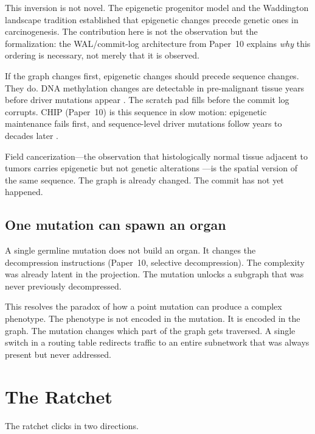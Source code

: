 \documentclass[11pt]{article}
\theoremstyle{definition}
\begin{document}
This inversion is not novel. The epigenetic progenitor model
\cite{Feinberg2006} and the Waddington landscape tradition
established that epigenetic changes precede genetic ones in
carcinogenesis. The contribution here is not the observation but
the formalization: the WAL/commit-log architecture from Paper~10
explains \emph{why} this ordering is necessary, not merely that
it is observed.

If the graph changes first, epigenetic changes should precede
sequence changes. They do. DNA methylation changes
are detectable in pre-malignant tissue years before driver mutations
appear \cite{Feinberg2006}. The scratch pad fills before the commit
log corrupts. CHIP (Paper~10) is this sequence in slow motion:
epigenetic maintenance fails first, and sequence-level driver
mutations follow years to decades later \cite{Jaiswal2014}.

Field cancerization---the observation that histologically normal
tissue adjacent to tumors carries epigenetic but not genetic
alterations \cite{Slaughter1953}---is the spatial version of the
same sequence. The graph is already changed. The commit has not yet
happened.

\subsection{One mutation can spawn an organ}

A single germline mutation does not build an organ. It changes the
decompression instructions (Paper~10, selective decompression).
The complexity was already latent in the projection. The mutation
unlocks a subgraph that was never previously decompressed.

This resolves the paradox of how a point mutation can produce a
complex phenotype. The phenotype is not encoded in the mutation.
It is encoded in the graph. The mutation changes which part of the
graph gets traversed. A single switch in a routing table redirects
traffic to an entire subnetwork that was always present but never
addressed.

\section{The Ratchet}
\label{sec:ratchet}

The ratchet clicks in two directions.
\end{document}
